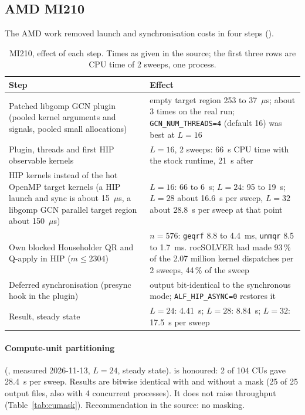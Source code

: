 \subsection{AMD MI210}
\label{sec:amd}

The AMD work removed launch and synchronisation costs in four steps ().

\begin{table}[h]
\centering
\caption{MI210, effect of each step. Times as given in the source; the first three rows are CPU time of 2 sweeps, one process.}
\label{tab:amdsteps}
\small
\begin{tabularx}{\textwidth}{@{}p{6.4cm}X@{}}
\toprule
Step & Effect \\
\midrule
Patched libgomp GCN plugin (pooled kernel arguments and signals, pooled small allocations) & empty target region 253 to 37~$\mu$s; about 3 times on the real run; \texttt{GCN\_NUM\_THREADS=4} (default 16) was best at $L=16$ \\ %
Plugin, threads and first HIP observable kernels & $L=16$, 2 sweeps: 66~s CPU time with the stock runtime, 21~s after \\ %
HIP kernels instead of the hot OpenMP target kernels (a HIP launch and sync is about 15~$\mu$s, a libgomp GCN parallel target region about 150~$\mu$s) & $L=16$: 66 to 6~s; $L=24$: 95 to 19~s; $L=28$ about 16.6~s per sweep, $L=32$ about 28.8~s per sweep at that point \\ %
Own blocked Householder QR and Q-apply in HIP ($m\le2304$) & $n=576$: \texttt{geqrf} 8.8 to 4.4~ms, \texttt{unmqr} 8.5 to 1.7~ms. rocSOLVER had made 93\,\% of the 2.07 million kernel dispatches per 2 sweeps, 44\,\% of the sweep \\ %
Deferred synchronisation (presync hook in the plugin) & output bit-identical to the synchronous mode; \texttt{ALF\_HIP\_ASYNC=0} restores it \\ %
\midrule
Result, steady state & $L=24$: 4.41~s; $L=28$: 8.84~s; $L=32$: 17.5~s per sweep \\ %
\bottomrule
\end{tabularx}
\end{table}

\paragraph{Compute-unit partitioning} (, measured 2026-11-13, $L=24$, steady state).  is honoured: 2 of 104 CUs gave 28.4~s per sweep. Results are bitwise identical with and without a mask (25 of 25 output files, also with 4 concurrent processes). It does not raise throughput (Table~\ref{tab:cumask}). Recommendation in the source: no masking.

